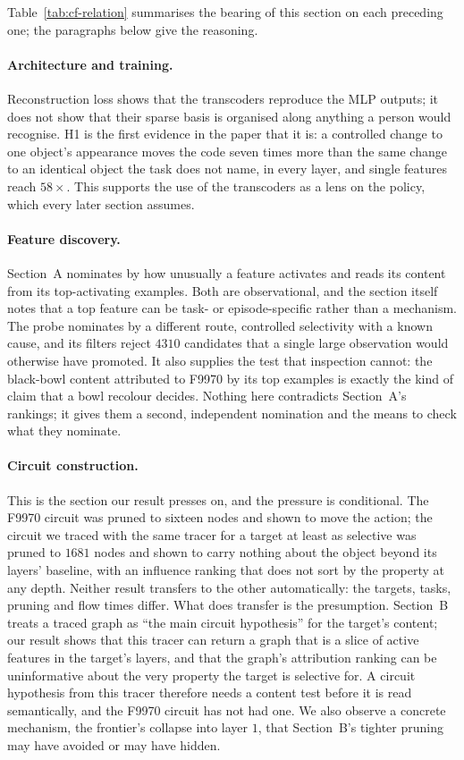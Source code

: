 Table~\ref{tab:cf-relation} summarises the bearing of this section on each
preceding one; the paragraphs below give the reasoning.

\paragraph{Architecture and training.}
Reconstruction loss shows that the transcoders reproduce the MLP outputs; it
does not show that their sparse basis is organised along anything a person
would recognise. H1 is the first evidence in the paper that it is: a
controlled change to one object's appearance moves the code seven times more
than the same change to an identical object the task does not name, in every
layer, and single features reach $58\times$. This supports the use of the
transcoders as a lens on the policy, which every later section assumes.

\paragraph{Feature discovery.}
Section~A nominates by how unusually a feature activates and reads its content
from its top-activating examples. Both are observational, and the section
itself notes that a top feature can be task- or episode-specific rather than a
mechanism. The probe nominates by a different route, controlled selectivity
with a known cause, and its filters reject $4310$ candidates that a single
large observation would otherwise have promoted. It also supplies the test that
inspection cannot: the black-bowl content attributed to F9970 by its top
examples is exactly the kind of claim that a bowl recolour decides. Nothing
here contradicts Section~A's rankings; it gives them a second, independent
nomination and the means to check what they nominate.

\paragraph{Circuit construction.}
This is the section our result presses on, and the pressure is conditional.
The F9970 circuit was pruned to sixteen nodes and shown to move the action; the
circuit we traced with the same tracer for a target at least as selective was
pruned to $1681$ nodes and shown to carry nothing about the object beyond its
layers' baseline, with an influence ranking that does not sort by the property
at any depth. Neither result transfers to the other automatically: the targets,
tasks, pruning and flow times differ. What does transfer is the presumption.
Section~B treats a traced graph as ``the main circuit hypothesis'' for the
target's content; our result shows that this tracer can return a graph that is
a slice of active features in the target's layers, and that the graph's
attribution ranking can be uninformative about the very property the target is
selective for. A circuit hypothesis from this tracer therefore needs a content
test before it is read semantically, and the F9970 circuit has not had one. We
also observe a concrete mechanism, the frontier's collapse into layer $1$, that
Section~B's tighter pruning may have avoided or may have hidden.

